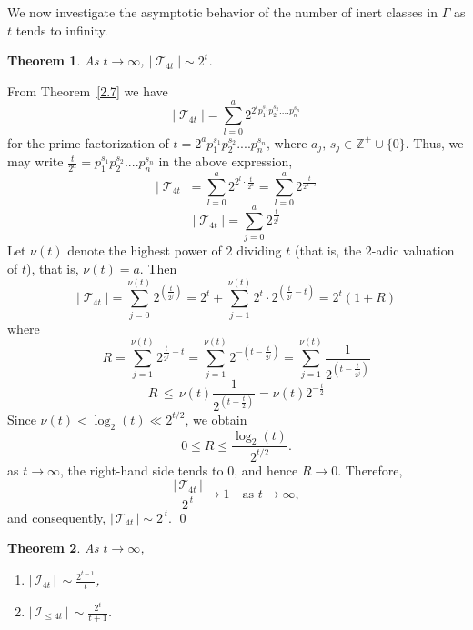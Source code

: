 \documentclass[a4paper,12pt]{amsart}
\renewenvironment{proof}{{\bfseries Proof.}}{\qed}
\numberwithin{equation}{section}
\newtheorem{theorem}{Theorem}[section]
\theoremstyle{definition}
\numberwithin{equation}{section}
\begin{document}
 We now investigate the asymptotic behavior of the number of inert classes in $\Gamma$ as $t$ tends to infinity.
\begin{theorem}\label{2.11}
   As $t \to \infty$,  $\lvert\;\mathcal{T}_{4t}\;\rvert \sim 2^t$. 
\end{theorem}
\begin{proof}
    From Theorem~\ref{2.7} we have 
$$\lvert\;\mathcal{T}_{4t}\;\rvert=\sum_{l=0}^{a}2^{2^lp_1^{s_1}p_2^{s_2}....p_n^{s_n}}$$ for the prime factorization of $t=2^ap_1^{s_1}p_2^{s_2}....p_n^{s_n}$, where $a_j,\, s_j \in \mathbb{Z}^+\cup\{0\}$. Thus, we may write $\frac{t}{2^a}=p_1^{s_1}p_2^{s_2}....p_n^{s_n} $ in the above expression,
$$\lvert\;\mathcal{T}_{4t}\;\rvert=\sum_{l=0}^{a}2^{2^l\cdot\frac{t}{2^a}}=\sum_{l=0}^{a}2^{\frac{t}{2^{a-l}}}$$
$$\lvert\;\mathcal{T}_{4t}\;\rvert=\sum_{j=0}^{a}2^{\frac{t}{2^{j}}}$$ Let $\nu(t)$ denote the highest power of $2$ dividing $t$ (that is, the 2-adic valuation of $t$), that is, $\nu(t)=a.$ Then
$$ \lvert\;\mathcal{T}_{4t}\;\rvert=\sum_{j=0}^{\nu(t)}2^{(\frac{t}{2^{j}})}=2^t+\sum_{j=1}^{\nu(t)} 2^t\cdot2^{(\frac{t}{2^{j}}-t)}=2^t(1+R)$$ where $$R=\sum_{j=1}^{\nu(t)}2^{\frac{t}{2^{j}}-t}=\sum_{j=1}^{\nu(t)}2^{-{(t-\frac{t}{2^{j}})}}=\sum_{j=1}^{\nu(t)}\frac{1}{2^{(t-\frac{t}{2^{j}})}}$$
$$R \,\leq\, \nu(t)\frac{1}{2^{(t-\frac{t}{2})}}=\nu(t)2^{-\frac{t}{2}}$$
Since $\nu(t) < \log_{2}(t) \ll 2^{t/2}$, we obtain
\[
0 \le R \le \frac{\log_{2}(t)}{2^{t/2}}.
\]
as $t \to \infty$, the right-hand side tends to $0$, and hence $R \to 0$. Therefore,
\[
\frac{\lvert\,\mathcal{T}_{4t}\,\rvert} {2^{\,t}}\to 1 \quad \text{as } t \to \infty,
\]and consequently, $\lvert\,\mathcal{T}_{4t}\,\rvert \sim 2^{\,t}.$
\end{proof}
\begin{theorem}\label{2.12} As $t \to \infty$, 
   \begin{enumerate}
   \item $\lvert\,\mathscr{I}_{4t}\,\rvert\, \sim \frac{2^{t-1}}{t}$, 
   \item $\lvert\,\mathscr{I}_{\leq4t}\,\rvert\, \sim \frac{2^{t}}{t+1}$. 
   \end{enumerate}
\end{theorem}
\end{document}
